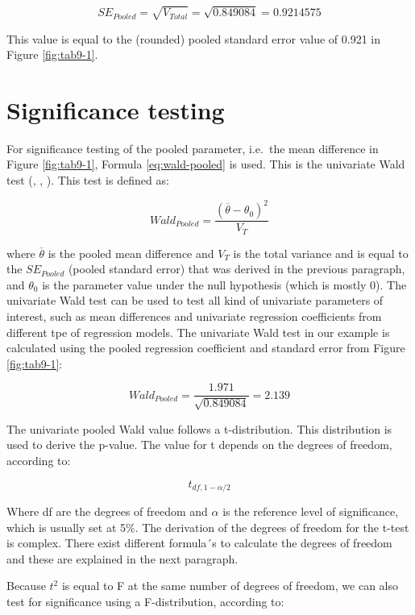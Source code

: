 \documentclass[]{book}
\begin{document}
\[SE_{Pooled} = \sqrt{V_{Total}} = \sqrt{0.849084} = 0.9214575\]

This value is equal to the (rounded) pooled standard error value of
0.921 in Figure \ref{fig:tab9-1}.

\section{Significance testing}\label{significance-testing}

For significance testing of the pooled parameter, i.e.~the mean
difference in Figure \ref{fig:tab9-1}, Formula \eqref{eq:wald-pooled} is
used. This is the univariate Wald test (\citet{Rubin1987},
\citet{VanBuuren2018}, \citet{Marshall2009MedResMeth}). This test is
defined as:

\begin{equation}
Wald_{Pooled} =\frac{(\overline{\theta} - {\theta_0})^2}{V_T}
  \label{eq:wald-pooled}
\end{equation}

where \(\overline{\theta}\) is the pooled mean difference and \(V_T\) is
the total variance and is equal to the \(SE_{Pooled}\) (pooled standard
error) that was derived in the previous paragraph, and \(\theta_0\) is
the parameter value under the null hypothesis (which is mostly 0). The
univariate Wald test can be used to test all kind of univariate
parameters of interest, such as mean differences and univariate
regression coefficients from different tpe of regression models. The
univariate Wald test in our example is calculated using the pooled
regression coefficient and standard error from Figure \ref{fig:tab9-1}:

\[Wald_{Pooled} = \frac{1.971}{\sqrt{0.849084}}=2.139\]

The univariate pooled Wald value follows a t-distribution. This
distribution is used to derive the p-value. The value for t depends on
the degrees of freedom, according to:

\begin{equation}
t_{df,1-\alpha/2}
  \label{eq:t-distr}
\end{equation}

Where df are the degrees of freedom and \(\alpha\) is the reference
level of significance, which is usually set at 5\%. The derivation of
the degrees of freedom for the t-test is complex. There exist different
formula´s to calculate the degrees of freedom and these are explained in
the next paragraph.

Because \(t^2\) is equal to F at the same number of degrees of freedom,
we can also test for significance using a F-distribution, according to:
\end{document}
